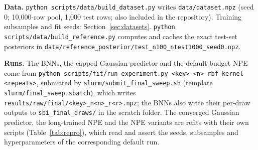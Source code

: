 \documentclass[11pt]{article}
\newcommand{\code}[1]{\texttt{#1}}
\begin{document}
\textbf{Data.} \code{python scripts/data/build\_dataset.py} writes \code{data/dataset.npz} (seed 0; 10{,}000-row pool,
1{,}000 test rows; also included in the repository). Training subsamples and fit seeds: Section~\ref{sec:datasets}.
\code{python scripts/data/build\_reference.py} computes and caches the exact test-set posteriors in
\code{data/reference\_posterior/test\_n100\_ntest1000\_seed0.npz}.

\textbf{Runs.} The BNNs, the capped Gaussian predictor and the default-budget NPE come from
\code{python scripts/fit/run\_experiment.py <key> <n> rbf\_kernel <repeats>}, submitted by
\code{slurm/submit\_final\_sweep.sh} (template \code{slurm/final\_sweep.sbatch}), which writes
\code{results/raw/final/<key>\_n<n>\_r<r>.npz}; the BNNs also write their per-draw outputs to
\code{sbi\_final\_draws/} in the scratch folder. The converged Gaussian predictor, the long-trained NPE and the NPE
variants are refits with their own scripts (Table~\ref{tab:repro}), which read and assert the seeds, subsamples and
hyperparameters of the corresponding default run.
\end{document}
